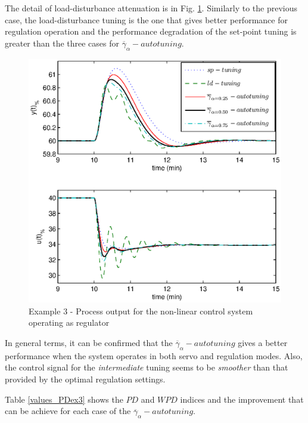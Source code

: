 The detail of load-disturbance attenuation is in Fig. \ref{y33}.
Similarly to the previous case, the load-disturbance tuning is the
one that gives better performance for regulation operation and the
performance degradation of the set-point tuning is greater than
the three cases for $\overline{\gamma}_{\alpha}-autotuning$.

\begin{figure}[htb!]
    \begin{center}
        \includegraphics[width=0.7\linewidth]{y3outp3.eps}
       \caption{Example 3 - Process output for the non-linear control system operating as regulator} \label{y33}
    \end{center}
\end{figure}

In general terms, it can be confirmed that the
$\overline{\gamma}_{\alpha}-autotuning$ gives a better performance
when the system operates in both servo and regulation modes. Also,
the control signal for the \emph{intermediate} tuning seems to be
\emph{smoother} than that provided by the optimal regulation
settings.

Table \ref{values_PDex3} shows the $\mathit{PD}$ and
$\mathit{WPD}$ indices and the improvement that can be achieve for
each case of the $\overline{\gamma}_{\alpha}-autotuning$.\\

